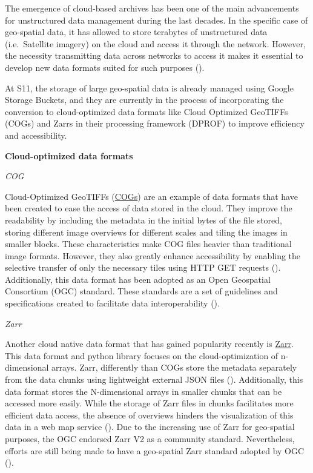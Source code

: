 \documentclass[
  oneside,
  open=any]{scrbook}
\begin{document}
The emergence of cloud-based archives has been one of the main
advancements for unstructured data management during the last decades.
In the specific case of geo-spatial data, it has allowed to store
terabytes of unstructured data (i.e.~Satellite imagery) on the cloud and
access it through the network. However, the necessity transmitting data
across networks to access it makes it essential to develop new data
formats suited for such purposes
().

At S11, the storage of large geo-spatial data is already managed using
Google Storage Buckets, and they are currently in the process of
incorporating the conversion to cloud-optimized data formats like Cloud
Optimized GeoTIFFs (COGs) and Zarrs in their processing framework
(DPROF) to improve efficiency and accessibility.

\newpage

\textbf{Cloud-optimized data formats}

\emph{COG}

Cloud-Optimized GeoTIFFs (\href{https://www.cogeo.org/}{COGs}) are an
example of data formats that have been created to ease the access of
data stored in the cloud. They improve the readability by including the
metadata in the initial bytes of the file stored, storing different
image overviews for different scales and tiling the images in smaller
blocks. These characteristics make COG files heavier than traditional
image formats. However, they also greatly enhance accessibility by
enabling the selective transfer of only the necessary tiles using HTTP
GET requests (). Additionally, this data format has been adopted as an Open
Geospatial Consortium (OGC) standard. These standards are a set of
guidelines and specifications created to facilitate data
interoperability ().

\emph{Zarr}

Another cloud native data format that has gained popularity recently is
\href{https://zarr.readthedocs.io/en/stable/}{Zarr}. This data format
and python library focuses on the cloud-optimization of n-dimensional
arrays. Zarr, differently than COGs store the metadata separately from
the data chunks using lightweight external JSON files
().
Additionally, this data format stores the N-dimensional arrays in
smaller chunks that can be accessed more easily. While the storage of
Zarr files in chunks facilitates more efficient data access, the absence
of overviews hinders the visualization of this data in a web map service
(). Due
to the increasing use of Zarr for geo-spatial purposes, the OGC endorsed
Zarr V2 as a community standard. Nevertheless, efforts are still being
made to have a geo-spatial Zarr standard adopted by OGC
().
\end{document}

